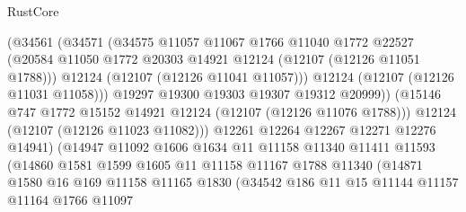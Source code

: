 \begin{lexlean}{RustCore}
\begin{coremodule}
                            (@34561
                              (@34571
                                (@34575
                                  @11057
                                  @11067
                                  @1766
                                  @11040
                                  @1772
                                  @22527
                                  (@20584
                                    @11050
                                    @1772
                                    @20303
                                    @14921
                                    @12124
                                    (@12107 (@12126 @11051 @1788)))
                                  @12124
                                  (@12107 (@12126 @11041 @11057)))
                                @12124
                                (@12107 (@12126 @11031 @11058)))
                              @19297
                              @19300
                              @19303
                              @19307
                              @19312
                              @20999))
                          (@15146 @747 @1772 @15152 @14921 @12124 (@12107 (@12126 @11076 @1788)))
                          @12124
                          (@12107 (@12126 @11023 @11082)))
                        @12261
                        @12264
                        @12267
                        @12271
                        @12276
                        @14941)
                      (@14947
                        @11092
                        @1606
                        @1634
                        @11
                        @11158
                        @11340
                        @11411
                        @11593
                        (@14860
                          @1581
                          @1599
                          @1605
                          @11
                          @11158
                          @11167
                          @1788
                          @11340
                          (@14871
                            @1580
                            @16
                            @169
                            @11158
                            @11165
                            @1830
                            (@34542
                              @186
                              @11
                              @15
                              @11144
                              @11157
                              @11164
                              @1766
                              @11097

\end{coremodule}
\end{lexlean}
